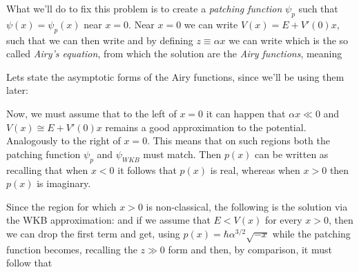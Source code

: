 \documentclass[oneside, 12pt, notitlepage]{book}
\begin{document}
What we'll do to fix this problem is to create a \emph{patching function} \(\psi_p\) such that \(\psi(x) = \psi_p(x)\) near \(x=0\). Near \(x=0\) we can write \(V(x) = E + V'(0)x\), such that
we can then write
and by defining \(z\equiv \alpha x\) we can write
which is the so called \emph{Airy's equation}, from which the solution are the \emph{Airy functions}, meaning
\par
Lets state the asymptotic forms of the Airy functions, since we'll be using them later:
\par

Now, we must assume that to the left of \(x=0\) it can happen that \(\alpha x \ll 0\) and \(V(x) \cong E + V'(0)x\) remains a good approximation to the potential. Analogously to the right of \(x=0\). This means that on such regions both the patching function \(\psi_p\) and \(\psi_{WKB}\) must match. Then \(p(x)\) can be written as
recalling that when \(x<0\) it follows that \(p(x)\) is real, whereas when \(x>0\) then \(p(x)\) is imaginary.\par

Since the region for which \(x>0\) is non-classical, the following is the solution via the WKB approximation:
and if we assume that \(E < V(x)\) for every \(x>0\), then we can drop the first term and get, using \(p(x) = \hbar \alpha^{3/2}\sqrt{-x}\)
while the patching function becomes, recalling the \(z\gg0\) form
and then, by comparison, it must follow that
\par
\end{document}

